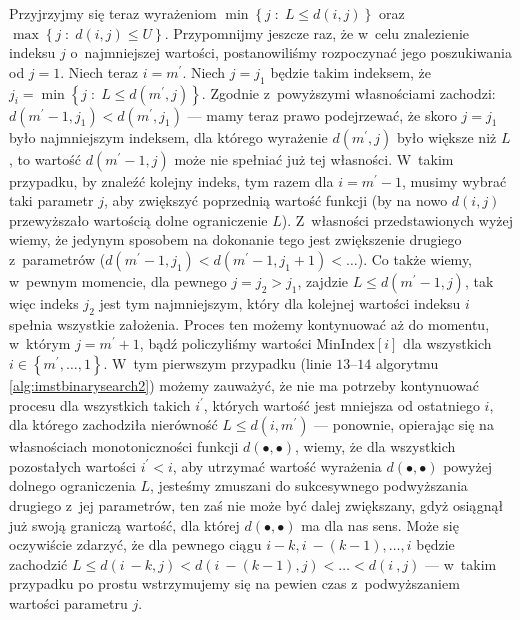 Przyjrzyjmy się teraz wyrażeniom $\min \left\{ j \; : \; L \leqslant d \left( i, j \right) \right\}$ oraz $\max \left\{ j \; : \; d \left( i, j \right) \leqslant U \right\}$. Przypomnijmy jeszcze raz, że w~celu znalezienie indeksu $j$ o~najmniejszej wartości, postanowiliśmy rozpoczynać jego poszukiwania od $j = 1$. Niech teraz $i = m^{\prime}$. Niech $j = j_{1}$ będzie takim indeksem, że $j_{i} = \min \left\{ j \; : \; L \leqslant d \left( m^{\prime}, j \right) \right\}$. Zgodnie z~powyższymi własnościami zachodzi: $d \left( m^{\prime} - 1, j_{1} \right) < d \left( m^{\prime}, j_{1} \right) $ --- mamy teraz prawo podejrzewać, że skoro $j = j_{1}$ było najmniejszym indeksem, dla którego wyrażenie $d \left( m^{\prime}, j \right)$ było większe niż $L$, to wartość $d \left( m^{\prime} - 1, j \right)$ może nie spełniać już tej własności. W~takim przypadku, by znaleźć kolejny indeks, tym razem dla $i = m^{\prime} - 1$, musimy wybrać taki parametr $j$, aby zwiększyć poprzednią wartość funkcji (by na nowo $d \left( i, j \right)$ przewyższało wartością dolne ograniczenie $L$). Z~własności przedstawionych wyżej wiemy, że jedynym sposobem na dokonanie tego jest zwiększenie drugiego z~parametrów ($d \left( m^{\prime} - 1, j_{1} \right) < d \left( m^{\prime} - 1, j_{1} + 1 \right) < \dots$). Co także wiemy, w~pewnym momencie, dla pewnego $j = j_{2} > j_{1}$, zajdzie $L \leqslant d \left( m^{\prime} - 1, j \right)$, tak więc indeks $j_{2}$ jest tym najmniejszym, który dla kolejnej wartości indeksu $i$ spełnia wszystkie założenia. Proces ten możemy kontynuować aż do momentu, w~którym $j = m^{\prime} + 1$, bądź policzyliśmy wartości $\text{MinIndex} \left[ i \right]$ dla wszystkich $i \in \left\{ m^{\prime}, \dots, 1 \right\}$. W~tym pierwszym przypadku (linie $13$--$14$ algorytmu \ref{alg:imstbinarysearch2}) możemy zauważyć, że nie ma potrzeby kontynuować procesu dla wszystkich takich $i^{\prime}$, których wartość jest mniejsza od ostatniego $i$, dla którego zachodziła nierówność $L \leqslant d \left( i, m^{\prime} \right)$ --- ponownie, opierając się na własnościach monotoniczności funkcji $d \left( \bullet, \bullet \right)$, wiemy, że dla wszystkich pozostałych wartości $i^{\prime} < i$, aby utrzymać wartość wyrażenia $d \left( \bullet, \bullet \right)$ powyżej dolnego ograniczenia $L$, jesteśmy zmuszani do sukcesywnego podwyższania drugiego z~jej parametrów, ten zaś nie może być dalej zwiększany, gdyż osiągnął już swoją graniczą wartość, dla której $d \left( \bullet, \bullet \right)$ ma dla nas sens. Może się oczywiście zdarzyć, że dla pewnego ciągu $i - k, i~- \left( k - 1 \right), \dots, i$ będzie zachodzić $L \leqslant d \left( i~- k, j \right) < d \left( i~- \left( k - 1 \right), j \right) < \dots < d \left( i~, j \right)$ --- w~takim przypadku po prostu wstrzymujemy się na pewien czas z~podwyższaniem wartości parametru $j$.

